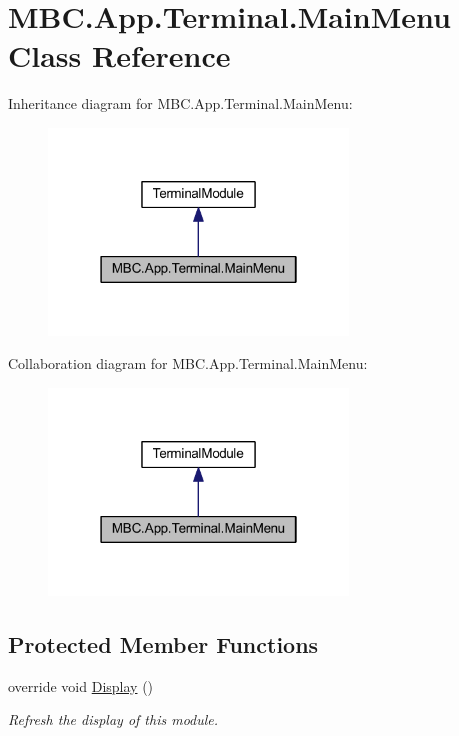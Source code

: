 \hypertarget{class_m_b_c_1_1_app_1_1_terminal_1_1_main_menu}{\section{M\-B\-C.\-App.\-Terminal.\-Main\-Menu Class Reference}
\label{class_m_b_c_1_1_app_1_1_terminal_1_1_main_menu}
}


Inheritance diagram for M\-B\-C.\-App.\-Terminal.\-Main\-Menu\-:
\nopagebreak
\begin{figure}[H]
\begin{center}
\leavevmode
\includegraphics[width=226pt]{class_m_b_c_1_1_app_1_1_terminal_1_1_main_menu__inherit__graph}
\end{center}
\end{figure}


Collaboration diagram for M\-B\-C.\-App.\-Terminal.\-Main\-Menu\-:
\nopagebreak
\begin{figure}[H]
\begin{center}
\leavevmode
\includegraphics[width=226pt]{class_m_b_c_1_1_app_1_1_terminal_1_1_main_menu__coll__graph}
\end{center}
\end{figure}
\subsection*{Protected Member Functions}
\begin{DoxyCompactItemize}
\item 
\hypertarget{class_m_b_c_1_1_app_1_1_terminal_1_1_main_menu_abebf7ba35e7c6fff4ba42eb9fa9be08d}{override void \hyperlink{class_m_b_c_1_1_app_1_1_terminal_1_1_main_menu_abebf7ba35e7c6fff4ba42eb9fa9be08d}{Display} ()}\label{class_m_b_c_1_1_app_1_1_terminal_1_1_main_menu_abebf7ba35e7c6fff4ba42eb9fa9be08d}

\begin{DoxyCompactList}\small\item\em Refresh the display of this module.\end{DoxyCompactList}\end{DoxyCompactItemize}
